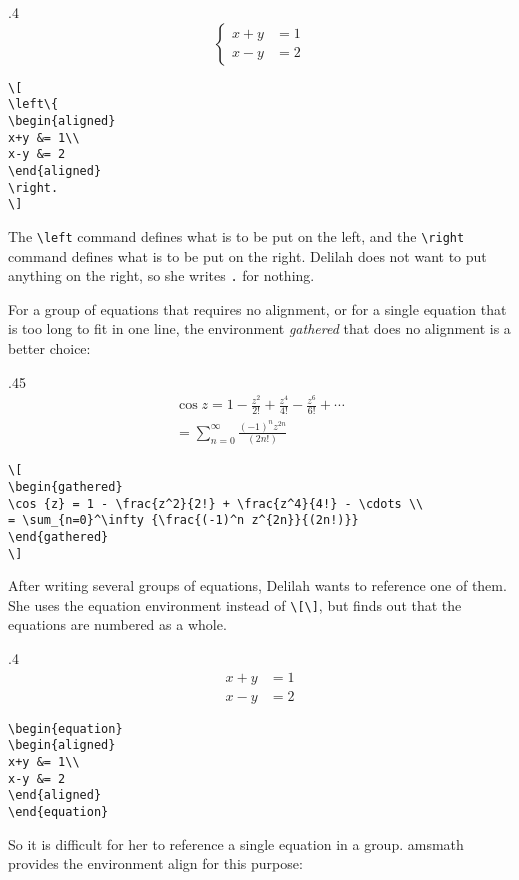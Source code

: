 \begin{miniexammar}{.4\textandmarginlen}{
\[
\left\{
\begin{aligned}
x+y &= 1\\
x-y &= 2
\end{aligned}
\right.
\]
}
\begin{lstlisting}
\[
\left\{
\begin{aligned}
x+y &= 1\\
x-y &= 2
\end{aligned}
\right.
\]
\end{lstlisting}
\end{miniexammar}
The \verb=\left= command defines what is to be put on the left, and the \verb=\right= command defines what is to be put on the right. Delilah does not want to put anything on the right, so she writes \verb=.= for nothing.

For a group of equations that requires no alignment, or for a single equation that is too long to fit in one line, the environment \emph{gathered} that does no alignment is a better choice:

\begin{miniexammar}{.45\textandmarginlen}{
\[
\begin{gathered}
\cos {z} = 1 - \frac{z^2}{2!} + \frac{z^4}{4!} - \frac{z^6}{6!} + \cdots \\
= \sum_{n=0}^\infty {\frac{(-1)^n z^{2n}}{(2n!)}}
\end{gathered}
\]
}
\begin{lstlisting}
\[
\begin{gathered}
\cos {z} = 1 - \frac{z^2}{2!} + \frac{z^4}{4!} - \cdots \\
= \sum_{n=0}^\infty {\frac{(-1)^n z^{2n}}{(2n!)}}
\end{gathered}
\]
\end{lstlisting}
\end{miniexammar}

After writing several groups of equations, Delilah wants to reference one of them. She uses the equation environment instead of \verb=\[\]=, but finds out that the equations are numbered as a whole.

\begin{miniexammar}{.4\textandmarginlen}{
\begin{equation}
\begin{aligned}
x+y &= 1\\
x-y &= 2
\end{aligned}
\end{equation}
}
\begin{lstlisting}
\begin{equation}
\begin{aligned}
x+y &= 1\\
x-y &= 2
\end{aligned}
\end{equation}
\end{lstlisting}
\end{miniexammar}
So it is difficult for her to reference a single equation in a group. amsmath provides the environment align for this purpose:

